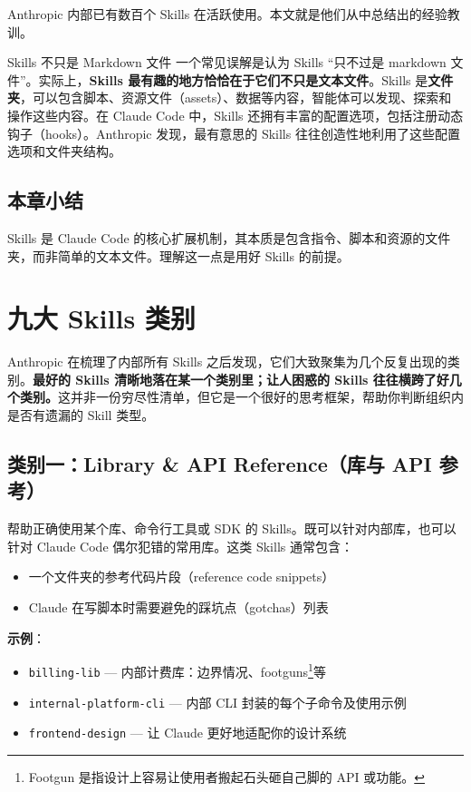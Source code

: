 \documentclass[a4paper]{article}
\begin{document}
Anthropic 内部已有数百个 Skills 在活跃使用。本文就是他们从中总结出的经验教训。

\begin{importantbox}{Skills 不只是 Markdown 文件}
一个常见误解是认为 Skills ``只不过是 markdown 文件''。实际上，\textbf{Skills 最有趣的地方恰恰在于它们不只是文本文件}。Skills 是\textbf{文件夹}，可以包含脚本、资源文件（assets）、数据等内容，智能体可以发现、探索和操作这些内容。在 Claude Code 中，Skills 还拥有丰富的配置选项，包括注册动态钩子（hooks）。Anthropic 发现，最有意思的 Skills 往往创造性地利用了这些配置选项和文件夹结构。
\end{importantbox}

\subsection{本章小结}

Skills 是 Claude Code 的核心扩展机制，其本质是包含指令、脚本和资源的文件夹，而非简单的文本文件。理解这一点是用好 Skills 的前提。

\section{九大 Skills 类别}

Anthropic 在梳理了内部所有 Skills 之后发现，它们大致聚集为几个反复出现的类别。\textbf{最好的 Skills 清晰地落在某一个类别里；让人困惑的 Skills 往往横跨了好几个类别。}这并非一份穷尽性清单，但它是一个很好的思考框架，帮助你判断组织内是否有遗漏的 Skill 类型。

\subsection{类别一：Library \& API Reference（库与 API 参考）}

帮助正确使用某个库、命令行工具或 SDK 的 Skills。既可以针对内部库，也可以针对 Claude Code 偶尔犯错的常用库。这类 Skills 通常包含：
\begin{itemize}
    \item 一个文件夹的参考代码片段（reference code snippets）
    \item Claude 在写脚本时需要避免的踩坑点（gotchas）列表
\end{itemize}

\textbf{示例}：
\begin{itemize}
    \item \texttt{billing-lib} --- 内部计费库：边界情况、footguns\footnote{Footgun 是指设计上容易让使用者搬起石头砸自己脚的 API 或功能。}等
    \item \texttt{internal-platform-cli} --- 内部 CLI 封装的每个子命令及使用示例
    \item \texttt{frontend-design} --- 让 Claude 更好地适配你的设计系统
\end{itemize}
\end{document}
